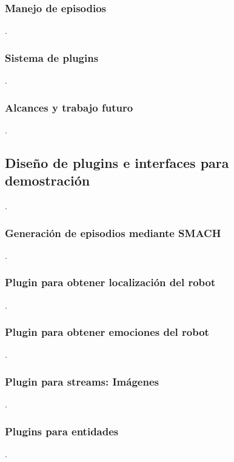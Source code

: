 \subsubsection{Manejo de episodios}
 .

\subsubsection{Sistema de plugins}
 .

\subsubsection{Alcances y trabajo futuro}
 .

\subsection{Diseño de plugins e interfaces para demostración}
 .

\subsubsection{Generación de episodios mediante SMACH}
 .

\subsubsection{Plugin para obtener localización del robot}
 .

\subsubsection{Plugin para obtener emociones del robot}
 .

\subsubsection{Plugin para streams: Imágenes}
 .

\subsubsection{Plugins para entidades}
 .

